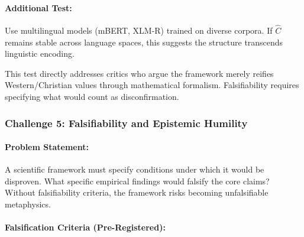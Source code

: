 \documentclass[11pt,a4paper]{article}
\theoremstyle{definition}
\theoremstyle{remark}
\begin{document}
\paragraph{Additional Test:} 
Use multilingual models (mBERT, XLM-R) trained on diverse corpora. If \(\hat{C}\) remains stable across language spaces, this suggests the structure transcends linguistic encoding.

This test directly addresses critics who argue the framework merely reifies Western/Christian values through mathematical formalism. Falsifiability requires specifying what would count as disconfirmation.

\subsubsection{Challenge 5: Falsifiability and Epistemic Humility}

\paragraph{Problem Statement:} 
A scientific framework must specify conditions under which it would be disproven. What specific empirical findings would falsify the core claims? Without falsifiability criteria, the framework risks becoming unfalsifiable metaphysics.

\paragraph{Falsification Criteria (Pre-Registered):}
\end{document}
